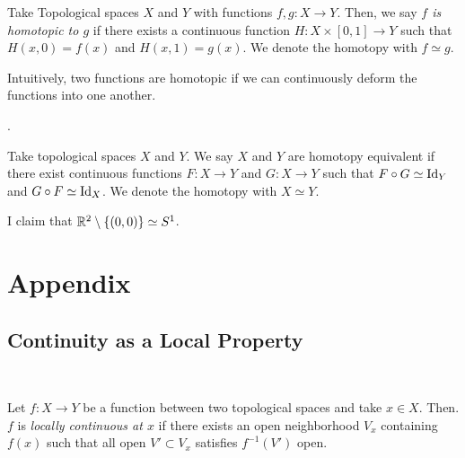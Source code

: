 \documentclass[../sean_thesis.tex]{subfiles}
\begin{document}
\begin{definition}
	Take Topological spaces $X$ and $Y$ with functions $f,g:X \to Y$. Then, we say \emph{$f$ is homotopic to $g$} if there exists a continuous function $H: X \times [0,1] \to Y$ such that $H(x,0) = f(x)$ and $H(x,1) = g(x)$. We denote the homotopy with $f \simeq g$.
\end{definition}
Intuitively, two functions are homotopic if we can continuously deform the functions into one another. 

.

\begin{definition}
	Take topological spaces $X$ and $Y$. We say $X$ and $Y$ are homotopy equivalent if there exist continuous functions $F:X \to Y$ and $G:X \to Y$ such that $F \circ G \simeq \operatorname{Id}_Y$ and $G \circ F \simeq \operatorname{Id}_X$. We denote the homotopy with $X \simeq Y$.
\end{definition}



\begin{example}
	I claim that $\mathbb{R}^2 \setminus \left\{(0,0)\right\} \simeq S^1$.
\end{example}

\section{Appendix}
\subsection{Continuity as a Local Property}~



\begin{definition}
	Let $f: X \to Y$ be a function between two topological spaces and take $x \in X$. Then. $f$ is \emph{locally continuous at $x$} if there exists an open neighborhood $V_x$  containing $f(x)$ such that all open $V' \subset V_x$ satisfies $f^{-1}(V')$ open.
\end{definition}
\end{document}
